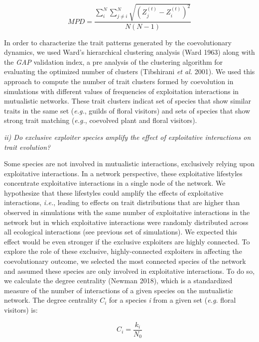 \documentclass[a4paper, 12pt]{article}
\begin{document}
\begin{equation} \label{eq:7}
MPD = \frac{\sum^{N}_{i}\sum^{N}_{j \neq i} \sqrt{(Z^{(t)}_{j} - Z^{(t)}_{i})^2}}{N(N-1)}  
\end{equation}

In order to characterize the trait patterns generated by the coevolutionary dynamics, we used Ward's hierarchical clustering analysis (Ward 1963) along with the \textit{GAP} validation index, a pre analysis of the clustering algorithm for evaluating the optimized number of clusters (Tibshirani \textit{et al.} 2001). We used this approach to compute the number of trait clusters formed by coevolution in simulations with different values of frequencies of exploitation interactions in mutualistic networks. These trait clusters indicat set of species that show similar traits in the same set (\textit{e.g.}, guilds of floral visitors) and sets of species that show strong trait matching (\textit{e.g.}, coevolved plant and floral visitors).

\textit{ii) Do exclusive exploiter species amplify the effect of exploitative interactions on trait evolution?}

Some species are not involved in mutualistic interactions, exclusively relying upon exploitative interactions. In a network perspective, these exploitative lifestyles concentrate exploitative interactions in a single node of the network. We hypothesize that these lifestyles could amplify the effects of exploitative interactions, \textit{i.e.}, leading to effects on trait distributions that are higher than observed in simulations with the same number of exploitative interactions in the network but in which exploitative interactions were randomly distributed across all ecological interactions (see previous set of simulations). We expected this effect would be even stronger if the exclusive exploiters are highly connected. To explore the role of these exclusive, highly-connected exploiters in affecting the coevolutionary outcome, we selected the most connected species of the network and assumed these species are only involved in exploitative interactions. To do so, we calculate the degree centrality (Newman 2018), which is a standardized measure of the number of interactions of a given species on the mutualistic network. The degree centrality $C_{i}$ for a species \textit{i} from a given set (\textit{e.g.} floral visitors) is:

\begin{equation} \label{eq:8}
  C_{i} = \frac{k_{i}} {N_{0}}
\end{equation}
\end{document}
